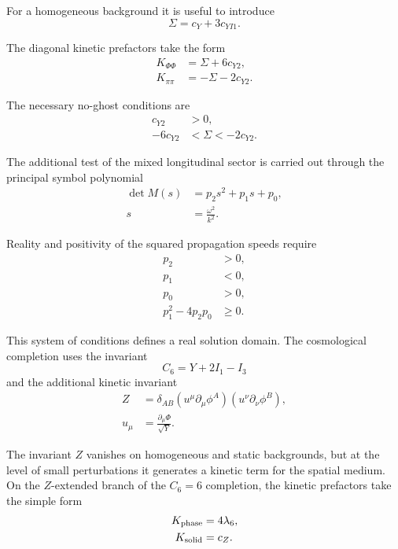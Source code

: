 \documentclass[12pt]{article}
\begin{document}
For a homogeneous background it is useful to introduce
\begin{equation}
\Sigma=c_Y+3c_{YI1}.
\end{equation}

The diagonal kinetic prefactors take the form
\begin{align}
K_{\Phi\Phi} &= \Sigma+6c_{Y2}, \\
K_{\pi\pi} &= -\Sigma-2c_{Y2}.
\end{align}

The necessary no-ghost conditions are
\begin{align}
c_{Y2} &> 0, \\
-6c_{Y2} &< \Sigma < -2c_{Y2}.
\end{align}

The additional test of the mixed longitudinal sector is carried out through the principal symbol polynomial
\begin{align}
\det M(s) &= p_2s^2+p_1s+p_0, \\
s &= \frac{\omega^2}{k^2}.
\end{align}

Reality and positivity of the squared propagation speeds require
\begin{align}
p_2 &> 0, \\
p_1 &< 0, \\
p_0 &> 0, \\
p_1^2-4p_2p_0 &\ge 0.
\end{align}

This system of conditions defines a real solution domain. The cosmological completion uses the invariant
\begin{equation}
C_6=Y+2I_1-I_3
\end{equation}
and the additional kinetic invariant
\begin{align}
Z &= \delta_{AB}
\left(u^\mu\partial_\mu\phi^A\right)
\left(u^\nu\partial_\nu\phi^B\right), \\
u_\mu &= \frac{\partial_\mu\Phi}{\sqrt{Y}}.
\end{align}

The invariant $Z$ vanishes on homogeneous and static backgrounds, but at the level of small perturbations it generates a kinetic term for the spatial medium. On the $Z$-extended branch of the $C_6=6$ completion, the kinetic prefactors take the simple form
\begin{align}
K_{\rm phase} &= 4\lambda_6, \\
K_{\rm solid} &= c_Z .
\end{align}
\end{document}
